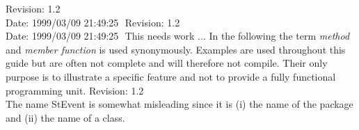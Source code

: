 %
%
%
%
%
%
%
%
%
%
%
  {\LARGE $ $Revision: 1.2 $ $}  \\[5mm] %
  {\LARGE $ $Date: 1999/03/09 21:49:25 $ $}  %
%
%
%
%
  {\LARGE $ $Revision: 1.2 $ $}  \\[5mm] %
  {\LARGE $ $Date: 1999/03/09 21:49:25 $ $}  %
This needs work ...
In the following the term \textit{method} and \textit{member function}
is used synonymously.
Examples are used throughout this guide but are often not complete
and will therefore not compile. Their only purpose is to illustrate
a specific feature and not to provide a fully functional programming unit.
  {\LARGE $ $Revision: 1.2 $ $}  \\[5mm] %
The name StEvent is somewhat misleading since it is (i) the name of the
package and (ii) the name of a class. 
